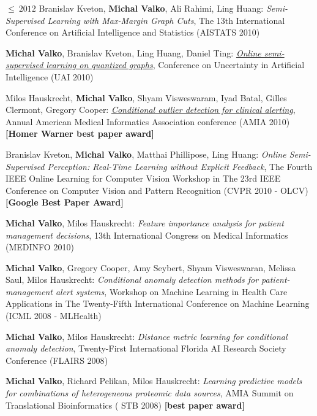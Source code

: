 \documentclass{resume}
\begin{document}
\begin{category}{$\leq\ 2012$}
\citembullet
Branislav Kveton, {\bf Michal Valko}, Ali Rahimi, Ling Huang:
\emph{Semi-Supervised Learning with Max-Margin Graph Cuts},
The 13th International Conference on Artificial Intelligence and Statistics
({\sf AISTATS 2010})

\citembullet    
{\bf Michal Valko}, Branislav Kveton, Ling Huang, Daniel Ting: 
\href{http://researchers.lille.inria.fr/~valko/hp/serve.php?what=publications/valko2010online.pdf}
{\emph{Online semi-supervised learning on quantized graphs}},
Conference on Uncertainty in Artificial Intelligence
({\sf UAI 2010})

\citembullet
Milos Hauskrecht, {\bf Michal Valko},  Shyam Visweswaram, Iyad Batal, Gilles Clermont, Gregory Cooper:
\href{http://researchers.lille.inria.fr/~valko/hp/serve.php?what=publications/hauskrecht2010conditional.pdf}
{\emph{Conditional outlier detection for clinical alerting}}, 
Annual American Medical Informatics
Association conference ({\sf AMIA 2010}) 
{\bf [Homer Warner best paper award]}


\citembullet
Branislav Kveton, {\bf Michal Valko}, Matthai Phillipose, Ling Huang:
\emph{Online Semi-Supervised Perception: Real-Time Learning without Explicit
Feedback},
The Fourth IEEE Online Learning for Computer Vision Workshop in The 23rd IEEE
Conference on Computer Vision and Pattern Recognition
({\sf CVPR 2010 - OLCV})  {\bf [Google Best Paper Award]}


\citembullet
{\bf Michal Valko}, Milos Hauskrecht:
\emph{Feature importance analysis for patient management decisions}, 
13th International Congress on Medical Informatics ({\sf MEDINFO 2010})

\citembullet
{\bf Michal Valko}, Gregory Cooper, Amy Seybert, Shyam Visweswaran, Melissa Saul, Milos Hauskrecht:
\emph{Conditional anomaly detection methods for patient-management alert systems}, Workshop on
Machine Learning in Health Care Applications in The Twenty-Fifth International Conference on
Machine Learning ({\sf ICML 2008 - MLHealth})

\citembullet    
{\bf Michal Valko}, Milos Hauskrecht: \emph{Distance metric learning for conditional anomaly detection},
Twenty-First International Florida AI Research Society Conference ({\sf FLAIRS 2008})

\citembullet    
{\bf Michal Valko},  Richard Pelikan, Milos Hauskrecht: \emph{Learning predictive models for combinations of heterogeneous
proteomic data sources}, AMIA Summit on Translational Bioinformatics ({\sf
      STB 2008})  {\bf [best paper award]}


\end{category}
\end{document}

